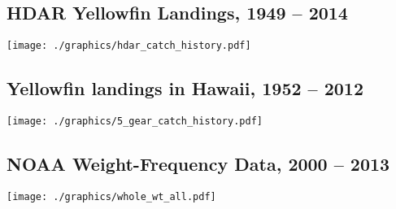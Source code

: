 \documentclass[a4paper,KOMA,landscape,titlepage]{powersem}
\begin{document}


\begin{slide}\section{HDAR Yellowfin Landings, 1949 -- 2014}
\begin{center}
\texttt{[image: ./graphics/hdar\_catch\_history.pdf]}
\end{center}
\end{slide}

\begin{slide}\section{Yellowfin landings in Hawaii, 1952 -- 2012}
\begin{center}
\texttt{[image: ./graphics/5\_gear\_catch\_history.pdf]}
\end{center}
\end{slide}

\begin{slide}\section{NOAA Weight-Frequency Data, 2000 -- 2013}
\begin{center}
\texttt{[image: ./graphics/whole\_wt\_all.pdf]}
\end{center}
\end{slide}
\end{document}
